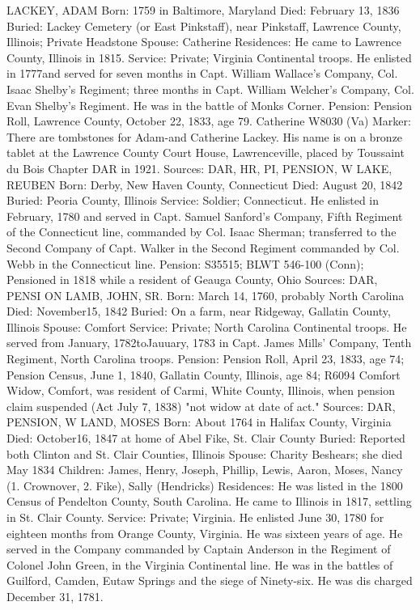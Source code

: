 LACKEY, ADAM
Born: 1759 in Baltimore, Maryland
Died: February 13, 1836
Buried: Lackey Cemetery (or East Pinkstaff), near Pinkstaff, Lawrence County, Illinois; Private Headstone
Spouse: Catherine Residences: He came to Lawrence County, Illinois in 1815.
Service: Private; Virginia Continental troops. He enlisted in 1777and served for seven months in Capt. William Wallace's Company, Col. Isaac Shelby's Regiment; three months in Capt. William Welcher's Company, Col. Evan Shelby's Regiment. He was in the battle of Monks Corner. 
Pension: Pension Roll, Lawrence County, October 22, 1833, age 79. Catherine W8030 (Va) 
Marker: There are tombstones for Adam-and Catherine Lackey. His name is on a bronze tablet at the Lawrence County Court House, Lawrenceville, placed by Toussaint du Bois Chapter DAR in 1921. 
Sources: DAR, HR, PI, PENSION, W 
LAKE, REUBEN
Born: Derby, New Haven County, Connecticut
Died: August 20, 1842
Buried: Peoria County, Illinois
Service: Soldier; Connecticut. He enlisted in February, 1780 and served in Capt. Samuel Sanford's Company, Fifth Regiment of the Connecticut line, com­manded by Col. Isaac Sherman; transferred to the Second Company of Capt. Walker in the Second Regiment commanded by Col. Webb in the Connecticut line. 
Pension: S35515; BLWT 546-100 (Conn); Pensioned in 1818 while a resident of Geauga County, Ohio
Sources: DAR, PENSI ON 
LAMB, JOHN, SR.
Born: March 14, 1760, probably North Carolina
Died: November15, 1842
Buried: On a farm, near Ridgeway, Gallatin County, Illinois
Spouse: Comfort 
Service: Private; North Carolina Continental troops. He served from January, 1782toJauuary, 1783 in Capt. James Mills' Company, Tenth Regiment, North Carolina troops. 
Pension: Pension Roll, April 23, 1833, age 74; Pension Census, June 1, 1840, Gallatin County, Illinois, age 84; R6094 Comfort Widow, Comfort, was resident of Carmi, White County, Illinois, when pen­sion claim suspended (Act July 7, 1838) "not widow at date of act." 
Sources: DAR, PENSION, W 
LAND, MOSES 
Born: About 1764 in Halifax County, Virginia 
Died: October16, 1847 at home of Abel Fike, St. Clair County 
Buried: Reported both Clinton and St. Clair Counties, Illinois 
Spouse: Charity Beshears; she died May 1834 
Children: James, Henry, Joseph, Phillip, Lewis, Aaron, Moses, Nancy (1. Crownover, 2. Fike), Sally (Hendricks) Residences: He was listed in the 1800 Census of Pendelton County, South Carolina. He came to Illinois in 1817, settling in St. Clair County. 
Service: Private; Virginia. He enlisted June 30, 1780 for eighteen months from Orange County, Virginia. He was sixteen years of age. He served in the Company commanded by Captain Anderson in the Regiment of Colonel John Green, in the Virginia Continental line. He was in the battles of Guilford, Camden, Eutaw Springs and the siege of Ninety-six. He was dis charged December 31, 1781. 
